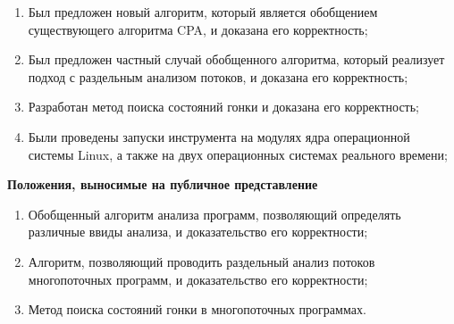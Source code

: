 {\novelty}
\begin{enumerate}
  \item Был предложен новый алгоритм, который является обобщением существующего алгоритма CPA, и доказана его корректность;
  \item Был предложен частный случай обобщенного алгоритма, который реализует подход с раздельным анализом потоков, и доказана его корректность;
  \item Разработан метод поиска состояний гонки и доказана его корректность;
  \item Были проведены запуски инструмента на модулях ядра операционной системы Linux, а также на двух операционных системах реального времени;
\end{enumerate}



\textbf{Положения, выносимые на публичное представление}
\begin{enumerate}
  \item Обобщенный алгоритм анализа программ, позволяющий определять различные ввиды анализа, и доказательство его корректности;
  \item Алгоритм, позволяющий проводить раздельный анализ потоков многопоточных программ, и доказательство его корректности;
  \item Метод поиска состояний гонки в многопоточных программах.
\end{enumerate}


